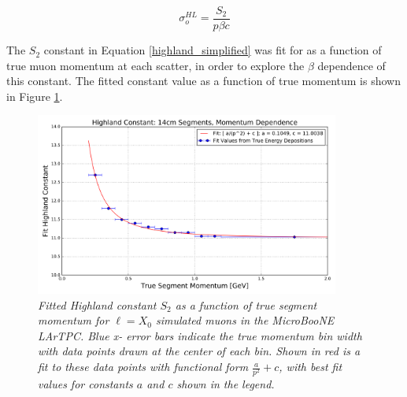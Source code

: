 \documentclass[a4paper,11pt]{article}
\begin{document}
\begin{equation}\label{highland_simplified}
	\sigma_o^{HL}=\frac{S_2}{p\beta c}
\end{equation}

The $S_2$ constant in Equation \ref{highland_simplified} was fit for as a function of true muon momentum at each scatter, in order to explore the $\beta$ dependence of this constant. The fitted constant value as a function of true momentum is shown in Figure \ref{retune_highland_fig1}.



\begin{figure}[ht!]
\begin{center}
\includegraphics[width=100mm]{Figures/highland_constant_optimization_momentumdependent.png}
\end{center}
\caption{\textit{Fitted Highland constant $S_2$ as a function of true segment momentum for ${\ell} = X_0$ simulated muons in the MicroBooNE LArTPC. Blue x- error bars indicate the true momentum bin width with data points drawn at the center of each bin. Shown in red is a fit to these data points with functional form $\frac{a}{p^2} + c$, with best fit values for constants $a$ and $c$ shown in the legend.}}
\label{retune_highland_fig1}
\end{figure}
\end{document}
